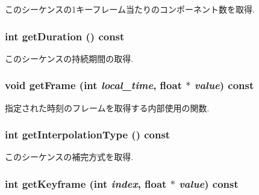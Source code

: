 このシーケンスの1キーフレーム当たりのコンポーネント数を取得. \hypertarget{classm3g_1_1KeyframeSequence_995a5ca5c8c3c993ef167f67cbb5fabe}{
\subsubsection[{getDuration}]{\setlength{\rightskip}{0pt plus 5cm}int getDuration () const}}
\label{classm3g_1_1KeyframeSequence_995a5ca5c8c3c993ef167f67cbb5fabe}


このシーケンスの持続期間の取得. \hypertarget{classm3g_1_1KeyframeSequence_e172563df4ce29c6fa9bca679e9bba7c}{
\subsubsection[{getFrame}]{\setlength{\rightskip}{0pt plus 5cm}void getFrame (int {\em local\_\-time}, \/  float $\ast$ {\em value}) const}}
\label{classm3g_1_1KeyframeSequence_e172563df4ce29c6fa9bca679e9bba7c}


指定された時刻のフレームを取得する内部使用の関数. \hypertarget{classm3g_1_1KeyframeSequence_0d46321e7f46e037508cce88cdf6a487}{
\subsubsection[{getInterpolationType}]{\setlength{\rightskip}{0pt plus 5cm}int getInterpolationType () const}}
\label{classm3g_1_1KeyframeSequence_0d46321e7f46e037508cce88cdf6a487}


このシーケンスの補完方式を取得. \hypertarget{classm3g_1_1KeyframeSequence_0fd27047149eedab8b10319768e1fe9a}{
\subsubsection[{getKeyframe}]{\setlength{\rightskip}{0pt plus 5cm}int getKeyframe (int {\em index}, \/  float $\ast$ {\em value}) const}}
\label{classm3g_1_1KeyframeSequence_0fd27047149eedab8b10319768e1fe9a}


